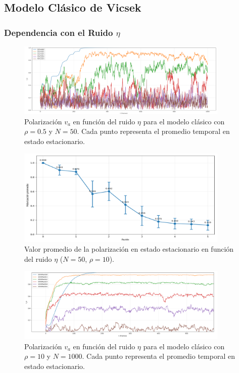 \documentclass{article}
\begin{document}
\subsection{Modelo Clásico de Vicsek}

\subsubsection{Dependencia con el Ruido $\eta$}
\begin{figure}[H]
\centering
\includegraphics[width=0.9\textwidth]{polarizacion_vs_ruido_promedio.png}
\caption{Polarización $v_a$ en función del ruido $\eta$ para el modelo clásico con $\rho = 0.5$ y $N = 50$. Cada punto representa el promedio temporal en estado estacionario.}
\label{fig:va_vs_eta_promedio}
\end{figure}

\begin{figure}[H]
\centering
\includegraphics[width=0.9\textwidth]{polarizacion_vs_ruido_promedio2.png}
\caption{Valor promedio de la polarización en estado estacionario en función del ruido $\eta$ ($N = 50$, $\rho = 10$).}
\label{fig:promedio_va_eta_promedio}
\end{figure}

\begin{figure}[H]
\centering
\includegraphics[width=0.9\textwidth]{promedio_polarizacion_ruido_promedio.png}
\caption{Polarización $v_a$ en función del ruido $\eta$ para el modelo clásico con $\rho = 10$ y $N = 1000$. Cada punto representa el promedio temporal en estado estacionario.}
\label{fig:va_vs_eta_promedio2}
\end{figure}
\end{document}
